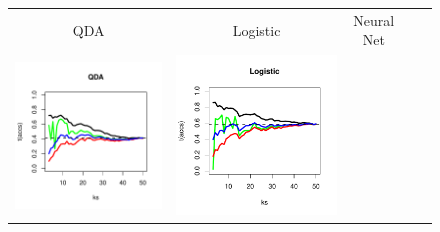 \documentclass[12pt]{article}
\begin{document}
\begin{figure}
\centering
\begin{tabular}{cccrl}
QDA & Logistic & Neural Net & \\
\multirow{5}{*}{\includegraphics[scale = 0.5, clip=true, trim=0.2in 0.6in 0.2in 0.7in]{../extrapolation/sim_qda.pdf}} &
\multirow{5}{*}{\includegraphics[scale = 0.5, clip=true, trim=0.75in 0.6in 0.2in 0.7in]{../extrapolation/sim_glmnet.pdf}} & 

\end{tabular}
\end{figure}
\end{document}
